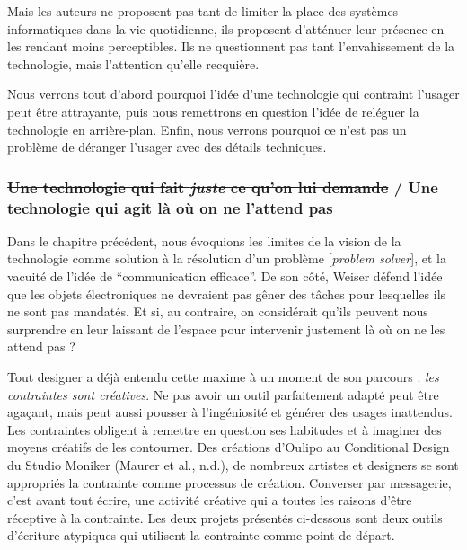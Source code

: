 \documentclass[]{article}
\begin{document}
Mais les auteurs ne proposent pas tant de limiter la place des systèmes
informatiques dans la vie quotidienne, ils proposent d'atténuer leur
présence en les rendant moins perceptibles. Ils ne questionnent pas tant
l'envahissement de la technologie, mais l'attention qu'elle recquière.

Nous verrons tout d'abord pourquoi l'idée d'une technologie qui
contraint l'usager peut être attrayante, puis nous remettrons en
question l'idée de reléguer la technologie en arrière-plan. Enfin, nous
verrons pourquoi ce n'est pas un problème de déranger l'usager avec des
détails techniques.

\newpage

\hypertarget{une-technologie-qui-fait-juste-ce-quon-lui-demande-une-technologie-qui-agit-luxe0-ouxf9-on-ne-lattend-pas}{%
\subsubsection{\texorpdfstring{\sout{Une technologie qui fait
\emph{juste} ce qu'on lui demande} / Une technologie qui agit là où on
ne l'attend
pas}{Une technologie qui fait juste ce qu'on lui demande / Une technologie qui agit là où on ne l'attend pas}}\label{une-technologie-qui-fait-juste-ce-quon-lui-demande-une-technologie-qui-agit-luxe0-ouxf9-on-ne-lattend-pas}}

Dans le chapitre précédent, nous évoquions les limites de la vision de
la technologie comme solution à la résolution d'un problème
{[}\emph{problem solver}{]}, et la vacuité de l'idée de ``communication
efficace''. De son côté, Weiser défend l'idée que les objets
électroniques ne devraient pas gêner des tâches pour lesquelles ils ne
sont pas mandatés. Et si, au contraire, on considérait qu'ils peuvent
nous surprendre en leur laissant de l'espace pour intervenir justement
là où on ne les attend pas ?

Tout designer a déjà entendu cette maxime à un moment de son parcours :
\emph{les contraintes sont créatives}. Ne pas avoir un outil
parfaitement adapté peut être agaçant, mais peut aussi pousser à
l'ingéniosité et générer des usages inattendus. Les contraintes obligent
à remettre en question ses habitudes et à imaginer des moyens créatifs
de les contourner. Des créations d'Oulipo au Conditional Design du
Studio Moniker (Maurer et al., n.d.), de nombreux artistes et designers
se sont appropriés la contrainte comme processus de création. Converser
par messagerie, c'est avant tout écrire, une activité créative qui a
toutes les raisons d'être réceptive à la contrainte. Les deux projets
présentés ci-dessous sont deux outils d'écriture atypiques qui utilisent
la contrainte comme point de départ.
\end{document}
